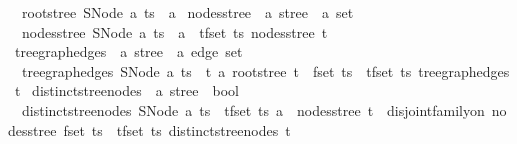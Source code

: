 \begin{isabellebody}
\ \ {\isachardoublequoteopen}root{\isacharunderscore}{\kern0pt}stree\ {\isacharparenleft}{\kern0pt}SNode\ a\ ts{\isacharparenright}{\kern0pt}\ {\isacharequal}{\kern0pt}\ a{\isachardoublequoteclose}\isanewline
\isanewline
{}\isamarkupfalse%
\ nodes{\isacharunderscore}{\kern0pt}stree\ {\isacharcolon}{\kern0pt}{\isacharcolon}{\kern0pt}\ {\isachardoublequoteopen}{\isacharprime}{\kern0pt}a\ stree\ {\isasymRightarrow}\ {\isacharprime}{\kern0pt}a\ set{\isachardoublequoteclose}\ \isanewline
\ \ {\isachardoublequoteopen}nodes{\isacharunderscore}{\kern0pt}stree\ {\isacharparenleft}{\kern0pt}SNode\ a\ ts{\isacharparenright}{\kern0pt}\ {\isacharequal}{\kern0pt}\ {\isacharbraceleft}{\kern0pt}a{\isacharbraceright}{\kern0pt}\ {\isasymunion}\ {\isacharparenleft}{\kern0pt}{\isasymUnion}t{\isasymin}fset\ ts{\isachardot}{\kern0pt}\ nodes{\isacharunderscore}{\kern0pt}stree\ t{\isacharparenright}{\kern0pt}{\isachardoublequoteclose}\isanewline
\isanewline
{}\isamarkupfalse%
\ tree{\isacharunderscore}{\kern0pt}graph{\isacharunderscore}{\kern0pt}edges\ {\isacharcolon}{\kern0pt}{\isacharcolon}{\kern0pt}\ {\isachardoublequoteopen}{\isacharprime}{\kern0pt}a\ stree\ {\isasymRightarrow}\ {\isacharprime}{\kern0pt}a\ edge\ set{\isachardoublequoteclose}\ \isanewline
\ \ {\isachardoublequoteopen}tree{\isacharunderscore}{\kern0pt}graph{\isacharunderscore}{\kern0pt}edges\ {\isacharparenleft}{\kern0pt}SNode\ a\ ts{\isacharparenright}{\kern0pt}\ {\isacharequal}{\kern0pt}\ {\isacharparenleft}{\kern0pt}{\isacharparenleft}{\kern0pt}{\isasymlambda}t{\isachardot}{\kern0pt}\ {\isacharbraceleft}{\kern0pt}a{\isacharcomma}{\kern0pt}\ root{\isacharunderscore}{\kern0pt}stree\ t{\isacharbraceright}{\kern0pt}{\isacharparenright}{\kern0pt}\ {\isacharbackquote}{\kern0pt}\ fset\ ts{\isacharparenright}{\kern0pt}\ {\isasymunion}\ {\isacharparenleft}{\kern0pt}{\isasymUnion}t{\isasymin}fset\ ts{\isachardot}{\kern0pt}\ tree{\isacharunderscore}{\kern0pt}graph{\isacharunderscore}{\kern0pt}edges\ t{\isacharparenright}{\kern0pt}{\isachardoublequoteclose}\isanewline
\isanewline
{}\isamarkupfalse%
\ distinct{\isacharunderscore}{\kern0pt}stree{\isacharunderscore}{\kern0pt}nodes\ {\isacharcolon}{\kern0pt}{\isacharcolon}{\kern0pt}\ {\isachardoublequoteopen}{\isacharprime}{\kern0pt}a\ stree\ {\isasymRightarrow}\ bool{\isachardoublequoteclose}\ \isanewline
\ \ {\isachardoublequoteopen}distinct{\isacharunderscore}{\kern0pt}stree{\isacharunderscore}{\kern0pt}nodes\ {\isacharparenleft}{\kern0pt}SNode\ a\ ts{\isacharparenright}{\kern0pt}\ {\isasymlongleftrightarrow}\ {\isacharparenleft}{\kern0pt}{\isasymforall}t{\isasymin}fset\ ts{\isachardot}{\kern0pt}\ a\ {\isasymnotin}\ nodes{\isacharunderscore}{\kern0pt}stree\ t{\isacharparenright}{\kern0pt}\ {\isasymand}\ disjoint{\isacharunderscore}{\kern0pt}family{\isacharunderscore}{\kern0pt}on\ nodes{\isacharunderscore}{\kern0pt}stree\ {\isacharparenleft}{\kern0pt}fset\ ts{\isacharparenright}{\kern0pt}\ {\isasymand}\ {\isacharparenleft}{\kern0pt}{\isasymforall}t{\isasymin}fset\ ts{\isachardot}{\kern0pt}\ distinct{\isacharunderscore}{\kern0pt}stree{\isacharunderscore}{\kern0pt}nodes\ t{\isacharparenright}{\kern0pt}{\isachardoublequoteclose}\isanewline

\end{isabellebody}
